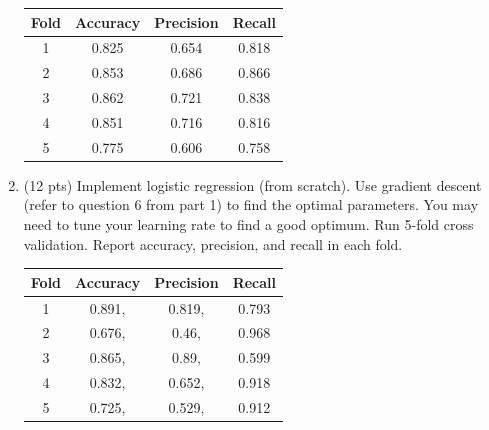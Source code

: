 \documentclass[a4paper]{article}
\theoremstyle{definition}
\newenvironment{soln}{
    \leavevmode\color{blue}\ignorespaces
}{}
\begin{document}
\begin{enumerate}
	\begin{soln} 
            \begin{center}
                \begin{tabular}{c|c c c}
                    \hline
                    Fold & Accuracy & Precision & Recall \\
                    \hline
                    1	& 0.825 & 0.654 & 0.818\\
                    2	& 0.853 & 0.686 & 0.866\\
                    3	& 0.862 & 0.721 & 0.838\\
                    4	& 0.851 & 0.716 & 0.816\\
                    5	& 0.775 & 0.606 & 0.758\\
                \end{tabular}
            \end{center}
            
        \end{soln}
	
	\item (12 pts) Implement logistic regression (from scratch). Use gradient descent (refer to question 6 from part 1) to find the optimal parameters. You may need to tune your learning rate to find a good optimum. Run 5-fold cross validation. Report accuracy, precision, and recall in each fold.
	
	\begin{soln}
            \begin{center}
                \begin{tabular}{c|c c c}
                    \hline
                    Fold & Accuracy & Precision & Recall \\
                    \hline
                       1	  & 0.891,	  & 0.819,	  & 0.793\\
                       2	  & 0.676,	  & 0.46,	  & 0.968\\
                       3	  & 0.865,	  & 0.89,	  & 0.599\\
                       4	  & 0.832,	  & 0.652,	  & 0.918\\
                       5	  & 0.725,	  & 0.529,	  & 0.912\\
                \end{tabular}
            \end{center}
        \end{soln}
	

\end{enumerate}
\end{document}
